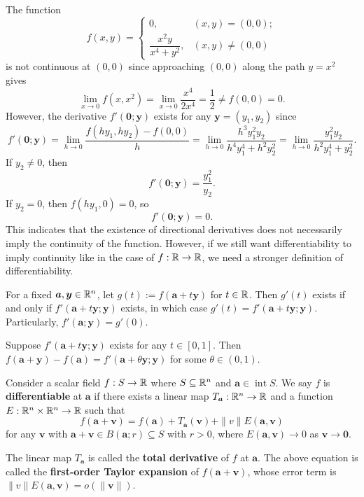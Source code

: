     \begin{exampleenv}
        The function
        $$ f(x,y) = \begin{cases}
            0, & (x,y) = (0,0); \\[6pt]
            \dfrac{x^2 y}{x^4 + y^2}, & (x,y) \ne (0,0)
        \end{cases}
        $$
        is not continuous at $(0,0)$ since approaching $(0,0)$ along the path $y=x^2$ gives
        $$ \lim_{x\to 0} f(x,x^2) = \lim_{x\to 0} \frac{x^4}{2x^4} = \frac{1}{2} \ne f(0,0) = 0. $$
        However, the derivative $f'(\bm 0; \bm y)$ exists for any $\bm y = (y_1, y_2)$ since
        $$ f'(\bm 0; \bm y) = \lim_{h\to 0} \frac{f(h y_1, h y_2) - f(0,0)}{h} = \lim_{h\to 0} \frac{h^3 y_1^2 y_2}{h^4 y_1^4 + h^2 y_2^2}= \lim_{h\to 0} \frac{y_1^2 y_2}{h^2 y_1^4 + y_2^2}.$$
        If \(y_2 \neq 0\), then
        \[
        f'(\bm 0;\bm y)
        =
        \frac{y_1^2}{y_2}.
        \]
        If \(y_2=0\), then \(f(hy_1,0)=0\), so
        \[
        f'(\bm 0;\bm y)=0.
        \]
        This indicates that the existence of directional derivatives does not necessarily imply the continuity of the function. However, if we still want differentiability to imply continuity like in the case of $f:\mathbb{R} \to \mathbb{R}$, we need a stronger definition of differentiability.
            
    \end{exampleenv}
    \begin{theoremenv}
        For a fixed $\bm a, \bm y \in \mathbb{R}^n$, let $g(t):= f(\bm a + t \bm y)$ for $t\in \mathbb{R}$. Then $g'(t)$ exists if and only if $f'(\bm a + t \bm y; \bm y)$ exists, in which case $g'(t) = f'(\bm a + t \bm y; \bm y)$. Particularly, $f'(\bm a; \bm y) = g'(0)$.
    \end{theoremenv}
    \begin{theoremenv}
        Suppose $f'(\bm a + t\bm y; \bm y)$ exists for any $t\in [0,1]$. Then $f(\bm a + \bm y) - f(\bm a) = f'(\bm a + \theta \bm y; \bm y)$ for some $\theta \in (0,1)$.
    \end{theoremenv}
    \begin{definitionenv}
        Consider a scalar field $f:S\to \mathbb{R}$ where $S\subseteq \mathbb{R}^n$ and $\bm a \in \operatorname{int} S$. We say $f$ is \textbf{differentiable} at $\bm a$ if there exists a linear map $T_{\bm a}:\mathbb{R}^n \to \mathbb{R}$ and a function $E:\mathbb{R}^n \times \mathbb{R}^n \to \mathbb{R}$ such that
        $$ f(\bm a + \bm v) = f(\bm a) + T_{\bm a}(\bm v) + \|v\|E(\bm a, \bm v) $$
        for any $\bm v$ with $\bm a + \bm v \in B(\bm a;r)\subseteq S$ with $r>0$, where $E(\bm a, \bm v) \to 0$ as $\bm v \to \bm 0$.

        The linear map $T_{\bm a}$ is called the \textbf{total derivative} of $f$ at $\bm a$. The above equation is called the \textbf{first-order Taylor expansion} of $f(\bm a+\bm v)$, whose error term is $\| v\|E(\bm a, \bm v)=o(\|\bm v\|)$.
    \end{definitionenv}
